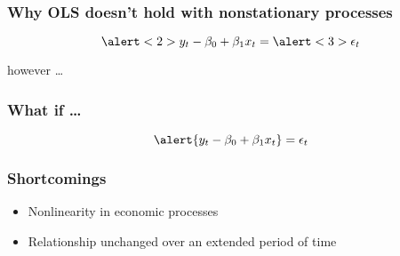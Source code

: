 \documentclass{beamer}
\begin{document}
\begin{frame}[t]\frametitle{Why OLS doesn't hold with nonstationary processes}
  
  \begin{center}
    \alert{
    } 
  \end{center}
  
  \begin{equation*}
    \alert<2>{y_t -\beta_0 + \beta_1 x_t} = \alert<3>{\epsilon_t}
  \end{equation*}
\end{frame}


\begin{frame}
  \begin{center}
    {\Large however \dots}
  \end{center}
\end{frame}

\begin{frame}[t]\frametitle{What if \dots}
  \begin{equation*}
    \alert{y_t -\beta_0 + \beta_1 x_t} = \epsilon_t
  \end{equation*}
\end{frame}

\begin{frame}[c]\frametitle{Shortcomings}
    \begin{itemize}
      \item<1-> Nonlinearity in economic processes
      \item<3-> Relationship unchanged over an extended period of time
    \end{itemize}
    
\end{frame}
\end{document}
